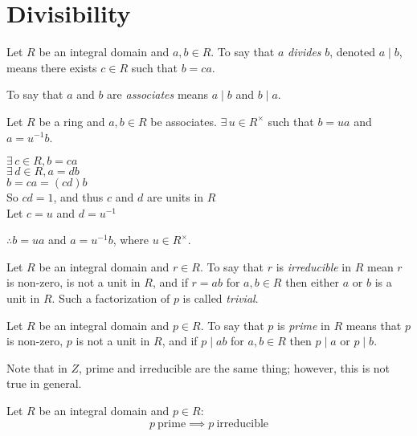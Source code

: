 \documentclass[letterpaper,12pt,fleqn]{article}
\newcommand{\x}{\times}
\begin{document}
\section*{Divisibility}

\begin{definition}[Divides]
  Let $R$ be an integral domain and $a,b\in R$. To say that $a$ \emph{divides} $b$,
  denoted $a\mid b$, means there exists $c\in R$ such that $b=ca$.
\end{definition}

\begin{definition}[Associate]
  To say that $a$ and $b$ are \emph{associates} means $a\mid b$ and $b\mid a$.
\end{definition}

\begin{theorem}
  Let $R$ be a ring and $a,b\in R$ be associates. $\exists\,u\in R^{\x}$ such that
  $b=ua$ and $a=u^{-1}b$.
\end{theorem}

\begin{theproof}
  $\exists\,c\in R,b=ca$ \\
  $\exists\,d\in R,a=db$ \\
  $b=ca=(cd)b$ \\
  So $cd=1$, and thus $c$ and $d$ are units in $R$ \\
  Let $c=u$ and $d=u^{-1}$
  
  $\therefore b=ua$ and $a=u^{-1}b$, where $u\in R^{\x}$.
\end{theproof}

\begin{definition}[Irreducible]
  Let $R$ be an integral domain and $r\in R$. To say that $r$ is \emph{irreducible} in
  $R$ mean $r$ is non-zero, is not a unit in $R$, and if $r=ab$ for $a,b\in R$ then
  either $a$ or $b$ is a unit in $R$. Such a factorization of $p$ is called
  \emph{trivial}.
\end{definition}

\begin{definition}[Prime]
  Let $R$ be an integral domain and $p\in R$. To say that $p$ is \emph{prime} in $R$
  means that $p$ is non-zero, $p$ is not a unit in $R$, and if $p\mid ab$ for $a,b\in R$
  then $p\mid a$ or $p\mid b$.

  Note that in $Z$, prime and irreducible are the same thing; however, this is not true
  in general.
\end{definition}

\begin{theorem}
  Let $R$ be an integral domain and $p\in R$:
  \[p\ \mbox{prime}\implies p\ \mbox{irreducible}\]
\end{theorem}
\end{document}

